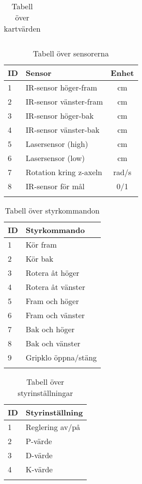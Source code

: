 \documentclass[11pt]{article}
\begin{document}
\begin{flushleft}
\begin{longtable}[l]{| l | l |}
\caption{Tabell över kartvärden }\label{maptab}
\end{longtable}

\begin{longtable}[l]{| l | l | c |} \hline
\textbf{ID} & \textbf{Sensor} & \textbf{Enhet} \\ \hline 
1 & IR-sensor höger-fram & cm \\ \hline
2 & IR-sensor vänster-fram  & cm \\ \hline
3 & IR-sensor höger-bak  & cm  \\ \hline
4 & IR-sensor vänster-bak  &  cm \\ \hline
5 & Lasersensor (high) & cm  \\ \hline
6 & Lasersensor (low) & cm  \\ \hline
7 & Rotation kring z-axeln & rad/s \\ \hline
8 & IR-sensor för mål & 0/1 \\ \hline
\caption{Tabell över sensorerna}\label{sensortab}
\end{longtable}

\begin{longtable}[l]{| l | l |} \hline
\textbf{ID} & \textbf{Styrkommando} \\ \hline 
1 & Kör fram \\ \hline
2 & Kör bak \\ \hline
3 & Rotera åt höger \\ \hline
4 & Rotera åt vänster \\ \hline
5 & Fram och höger \\ \hline
6 & Fram och vänster \\ \hline
7 & Bak och höger \\ \hline
8 & Bak och vänster \\ \hline
9 & Gripklo öppna/stäng \\ \hline

\caption{Tabell över styrkommandon}\label{styrtab}
\end{longtable}

\begin{longtable}[l]{| l | l |} \hline
\textbf{ID} & \textbf{Styrinställning} \\ \hline 
1 & Reglering av/på \\ \hline
2 & P-värde \\ \hline
3 & D-värde \\ \hline
4 & K-värde \\ \hline

\caption{Tabell över styrinställningar}\label{styrinsttab}
\end{longtable}



\end{flushleft}
\end{document}
